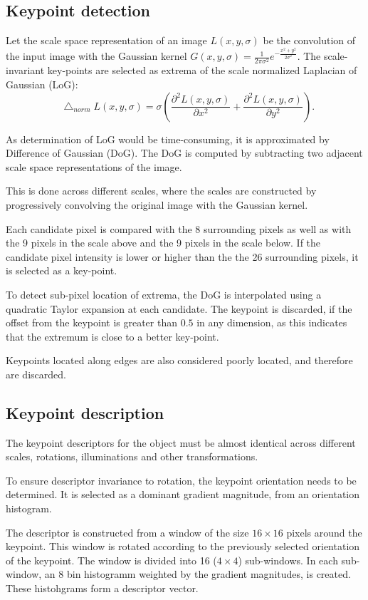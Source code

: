 \documentclass{aip-cp}
\newcommand*\Laplace{\mathop{}\!\mathbin\bigtriangleup}
\begin{document}
\subsection{Keypoint detection}
Let the scale space representation of an image $L(x,y,\sigma)$ be the convolution of the input image with the Gaussian kernel $G(x,y,\sigma) = \frac{1}{2\pi\sigma^2}e^{-\frac{x^2+y^2}{2\sigma^2}}$. The scale-invariant key-points are selected as extrema of the scale normalized Laplacian of Gaussian (LoG):
\begin{equation}
    \Laplace_{norm} L(x, y, \sigma) = \sigma \left(\frac{\partial^2 L(x,y,\sigma)}{\partial x^2} + \frac{\partial^2 L(x,y,\sigma)}{\partial y^2}\right).
\end{equation}

As determination of LoG would be time-consuming, it is approximated by Difference of Gaussian (DoG). The DoG is computed by subtracting two adjacent scale space representations of the image.

This is done across different scales, where the scales are constructed by progressively convolving the original image with the Gaussian kernel.

Each candidate pixel is compared with the 8 surrounding pixels as well as with the 9 pixels in the scale above and the 9 pixels in the scale below. If the candidate pixel intensity is lower or higher than the the 26 surrounding pixels, it is selected as a key-point.

To detect sub-pixel location of extrema, the DoG is interpolated using a quadratic Taylor expansion at each candidate. The keypoint is discarded, if the offset from the keypoint is greater than $0.5$ in any dimension, as this indicates that the extremum is close to a better key-point.

Keypoints located along edges are also considered poorly located, and therefore are discarded.

\subsection{Keypoint description}
The keypoint descriptors for the object must be almost identical across different scales, rotations, illuminations and other transformations.

To ensure descriptor invariance to rotation, the keypoint orientation needs to be determined. It is selected as a dominant gradient magnitude, from an orientation histogram.

The descriptor is constructed from a window of the size $16 \times 16$ pixels around the keypoint. This window is rotated according to the previously selected orientation of the keypoint. The window is divided into 16 ($4 \times 4$) sub-windows. In each sub-window, an $8$ bin histogramm weighted by the gradient magnitudes, is created. These histohgrams form a descriptor vector.
\end{document}
